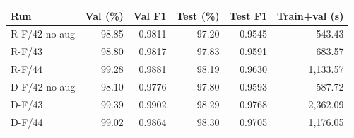 \begin{tabular}{lrrrrr}
\toprule
Run & Val (\%) & Val F1 & Test (\%) & Test F1 & Train+val (s)\\
\midrule
R-F/42 no-aug & 98.85 & 0.9811 & 97.20 & 0.9545 & 543.43\\
R-F/43 & 98.80 & 0.9817 & 97.83 & 0.9591 & 683.57\\
R-F/44 & 99.28 & 0.9881 & 98.19 & 0.9630 & 1,133.57\\
D-F/42 no-aug & 98.10 & 0.9776 & 97.80 & 0.9593 & 587.72\\
D-F/43 & 99.39 & 0.9902 & 98.29 & 0.9768 & 2,362.09\\
D-F/44 & 99.02 & 0.9864 & 98.30 & 0.9705 & 1,176.05\\
\bottomrule
\end{tabular}
